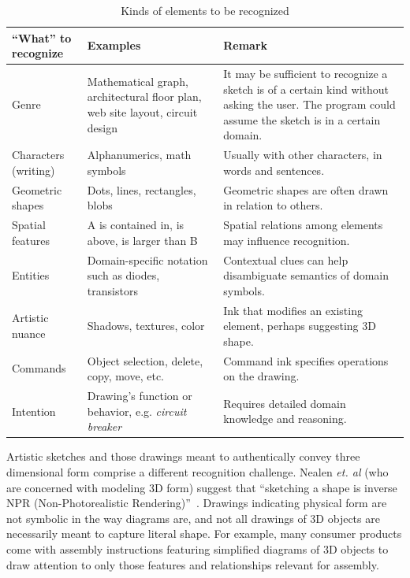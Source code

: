 \begin{landscape}
\begin{table}
\label{tab:what}
\begin{tabular}{ p{4cm} | p{4.5cm} | p{5.5cm} }
\textbf{``What'' to recognize} & 
\textbf{Examples} & 
\textbf{Remark} \\ 
\hline \hline

Genre &
Mathematical graph, architectural floor plan, web site layout, circuit design &

It may be sufficient to recognize a sketch is of a certain kind
without asking the user. The program could assume the sketch is
in a certain domain.\\ \hline

Characters (writing) & 
Alphanumerics, math symbols & 
Usually with other characters, in words and sentences. \\ \hline

Geometric shapes & 
Dots, lines, rectangles, blobs &
Geometric shapes are often drawn in relation to others. \\ \hline

Spatial features &
A is contained in, is above, is larger than B &
Spatial relations among elements may influence recognition. \\ \hline

Entities &
Domain-specific notation such as diodes, transistors &
Contextual clues can help disambiguate semantics of domain symbols. \\ \hline

Artistic nuance &
Shadows, textures, color &
Ink that modifies an existing element, perhaps suggesting 3D shape. \\ \hline

Commands &
Object selection, delete, copy, move, etc. &
Command ink specifies operations on the drawing. \\ \hline

Intention &
Drawing's function or behavior, e.g. \textit{circuit breaker} & 
Requires detailed domain knowledge and reasoning. \\ \hline

\end{tabular}
\caption{Kinds of elements to be recognized}
\end{table}
\end{landscape}

Artistic sketches and those drawings meant to authentically convey
three dimensional form comprise a different recognition
challenge. Nealen \textit{et. al} (who are concerned with modeling 3D
form) suggest that ``sketching a shape is inverse NPR
(Non-Photorealistic Rendering)''~\cite{nealen-3d-sketch}. Drawings
indicating physical form are not symbolic in the way diagrams are, and
not all drawings of 3D objects are necessarily meant to capture
literal shape. For example, many consumer products come with assembly
instructions featuring simplified diagrams of 3D objects to draw
attention to only those features and relationships relevant for
assembly.

